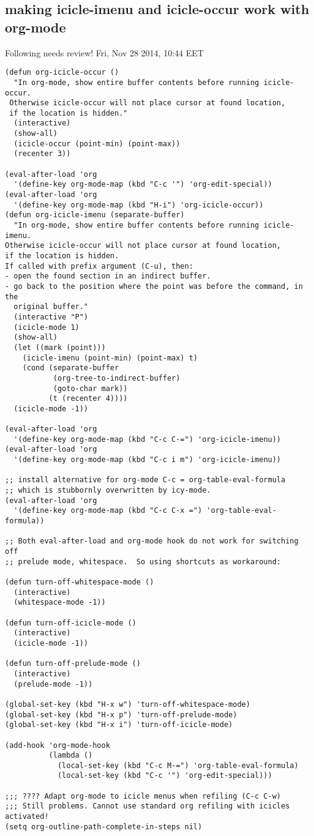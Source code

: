 \documentclass[10pt]{article}
\begin{document}
\subsection{making icicle-imenu and icicle-occur work with org-mode}
\label{sec-3-2}
Following needs review! Fri, Nov 28 2014, 10:44 EET
\begin{verbatim}
(defun org-icicle-occur ()
  "In org-mode, show entire buffer contents before running icicle-occur.
 Otherwise icicle-occur will not place cursor at found location,
 if the location is hidden."
  (interactive)
  (show-all)
  (icicle-occur (point-min) (point-max))
  (recenter 3))

(eval-after-load 'org
  '(define-key org-mode-map (kbd "C-c '") 'org-edit-special))
(eval-after-load 'org
  '(define-key org-mode-map (kbd "H-i") 'org-icicle-occur))
(defun org-icicle-imenu (separate-buffer)
  "In org-mode, show entire buffer contents before running icicle-imenu.
Otherwise icicle-occur will not place cursor at found location,
if the location is hidden.
If called with prefix argument (C-u), then:
- open the found section in an indirect buffer.
- go back to the position where the point was before the command, in the
  original buffer."
  (interactive "P")
  (icicle-mode 1)
  (show-all)
  (let ((mark (point)))
    (icicle-imenu (point-min) (point-max) t)
    (cond (separate-buffer
           (org-tree-to-indirect-buffer)
           (goto-char mark))
          (t (recenter 4))))
  (icicle-mode -1))

(eval-after-load 'org
  '(define-key org-mode-map (kbd "C-c C-=") 'org-icicle-imenu))
(eval-after-load 'org
  '(define-key org-mode-map (kbd "C-c i m") 'org-icicle-imenu))

;; install alternative for org-mode C-c = org-table-eval-formula
;; which is stubbornly overwritten by icy-mode.
(eval-after-load 'org
  '(define-key org-mode-map (kbd "C-c C-x =") 'org-table-eval-formula))

;; Both eval-after-load and org-mode hook do not work for switching off
;; prelude mode, whitespace.  So using shortcuts as workaround:

(defun turn-off-whitespace-mode ()
  (interactive)
  (whitespace-mode -1))

(defun turn-off-icicle-mode ()
  (interactive)
  (icicle-mode -1))

(defun turn-off-prelude-mode ()
  (interactive)
  (prelude-mode -1))

(global-set-key (kbd "H-x w") 'turn-off-whitespace-mode)
(global-set-key (kbd "H-x p") 'turn-off-prelude-mode)
(global-set-key (kbd "H-x i") 'turn-off-icicle-mode)

(add-hook 'org-mode-hook
          (lambda ()
            (local-set-key (kbd "C-c M-=") 'org-table-eval-formula)
            (local-set-key (kbd "C-c '") 'org-edit-special)))

;;; ???? Adapt org-mode to icicle menus when refiling (C-c C-w)
;;; Still problems. Cannot use standard org refiling with icicles activated!
(setq org-outline-path-complete-in-steps nil)
\end{verbatim}
\end{document}
